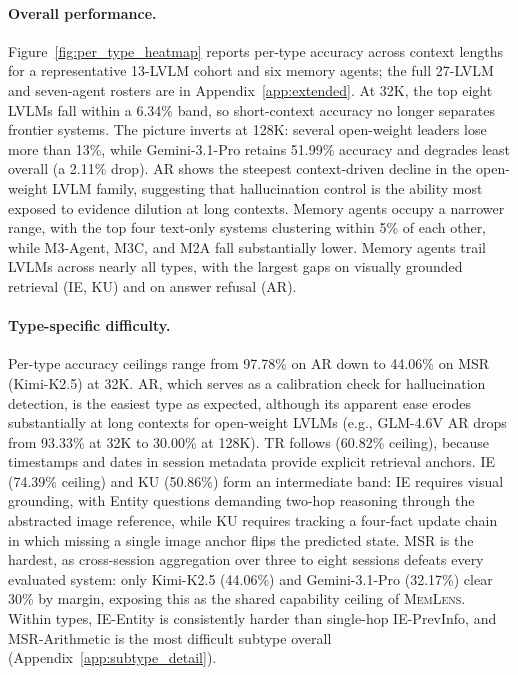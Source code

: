 \documentclass{article}
\newcommand{\bench}{\textsc{MemLens}}
\begin{document}
\paragraph{Overall performance.}
Figure~\ref{fig:per_type_heatmap} reports per-type accuracy across context lengths for a representative 13-LVLM cohort and six memory agents; the full 27-LVLM and seven-agent rosters are in Appendix~\ref{app:extended}. At 32K, the top eight LVLMs fall within a 6.34\% band, so short-context accuracy no longer separates frontier systems. The picture inverts at 128K: several open-weight leaders lose more than 13\%, while Gemini-3.1-Pro retains 51.99\% accuracy and degrades least overall (a 2.11\% drop). AR shows the steepest context-driven decline in the open-weight LVLM family, suggesting that hallucination control is the ability most exposed to evidence dilution at long contexts. Memory agents occupy a narrower range, with the top four text-only systems clustering within 5\% of each other, while M3-Agent, M3C, and M2A fall substantially lower. Memory agents trail LVLMs across nearly all types, with the largest gaps on visually grounded retrieval (IE, KU) and on answer refusal (AR).

\paragraph{Type-specific difficulty.}
Per-type accuracy ceilings range from 97.78\% on AR down to 44.06\% on MSR (Kimi-K2.5) at 32K. AR, which serves as a calibration check for hallucination detection, is the easiest type as expected, although its apparent ease erodes substantially at long contexts for open-weight LVLMs (e.g., GLM-4.6V AR drops from 93.33\% at 32K to 30.00\% at 128K). TR follows (60.82\% ceiling), because timestamps and dates in session metadata provide explicit retrieval anchors. IE (74.39\% ceiling) and KU (50.86\%) form an intermediate band: IE requires visual grounding, with Entity questions demanding two-hop reasoning through the abstracted image reference, while KU requires tracking a four-fact update chain in which missing a single image anchor flips the predicted state. MSR is the hardest, as cross-session aggregation over three to eight sessions defeats every evaluated system: only Kimi-K2.5 (44.06\%) and Gemini-3.1-Pro (32.17\%) clear 30\% by margin, exposing this as the shared capability ceiling of \bench{}. Within types, IE-Entity is consistently harder than single-hop IE-PrevInfo, and MSR-Arithmetic is the most difficult subtype overall (Appendix~\ref{app:subtype_detail}).
\end{document}
